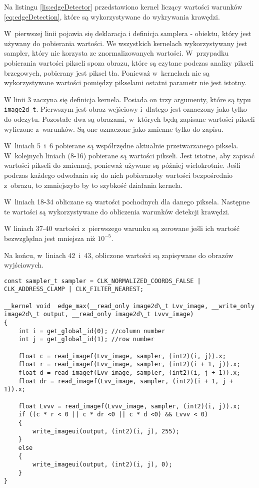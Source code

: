 Na listingu \ref{lis:edgeDetector} przedstawiono kernel liczący wartości warunków \eqref{eq:edgeDetection}, które są wykorzystywane do wykrywania krawędzi. 

W~pierwszej linii pojawia się deklaracja i definicja samplera - obiektu, który jest używany do pobierania wartości. We wszystkich kernelach wykorzystywany jest sampler, który nie korzysta ze znormalizowanych wartości. W~przypadku pobierania wartości pikseli spoza obrazu, które są czytane podczas analizy pikseli brzegowych, pobierany jest piksel tła. Ponieważ w~kernelach nie są wykorzystywane wartości pomiędzy pikselami ostatni parametr nie jest istotny.

W linii 3 zaczyna się definicja kernela. Posiada on trzy argumenty, które są typu \texttt{image2d\_t}. Pierwszym jest obraz wejściowy i~dlatego jest oznaczony jako tylko do odczytu. Pozostałe dwa są obrazami, w~których będą zapisane wartości pikseli wyliczone z~warunków. Są one oznaczone jako zmienne tylko do zapisu.

W~liniach 5~i~6 pobierane są współrzędne aktualnie przetwarzanego piksela. W~kolejnych liniach (8-16) pobierane są wartości pikseli. Jest istotne, aby zapisać wartości pikseli do zmiennej, ponieważ używane są później wielokrotnie. Jeśli podczas każdego odwołania się do nich pobieranoby wartości bezpośrednio z~obrazu, to zmniejszyło by to szybkość działania kernela.

W~liniach 18-34 obliczane są wartości pochodnych dla danego piksela. Następne te wartości są wykorzystywane do obliczenia warunków detekcji krawędzi.

W liniach 37-40 wartości z~pierwszego warunku są zerowane jeśli ich wartość bezwzględna jest mniejsza niż $  10^{-5} $.

Na końcu, w~liniach 42~i~43, obliczone wartości są zapisywane do obrazów wyjściowych.

\begin{lstlisting}[float]
const sampler_t sampler = CLK_NORMALIZED_COORDS_FALSE | CLK_ADDRESS_CLAMP | CLK_FILTER_NEAREST;

__kernel void  edge_max(__read_only image2d\_t Lvv_image, __write_only image2d\_t output, __read_only image2d\_t Lvvv_image)
{
	int i = get_global_id(0); //column number
	int j = get_global_id(1); //row number

	float c = read_imagef(Lvv_image, sampler, (int2)(i, j)).x;
	float r = read_imagef(Lvv_image, sampler, (int2)(i + 1, j)).x;
	float d = read_imagef(Lvv_image, sampler, (int2)(i, j + 1)).x;
	float dr = read_imagef(Lvv_image, sampler, (int2)(i + 1, j + 1)).x;
	
	float Lvvv = read_imagef(Lvvv_image, sampler, (int2)(i, j)).x;
	if ((c * r < 0 || c * dr <0 || c * d <0) && Lvvv < 0)
	{
		write_imageui(output, (int2)(i, j), 255);
	}
	else
	{
		write_imageui(output, (int2)(i, j), 0);
	}
}
\end{lstlisting}

